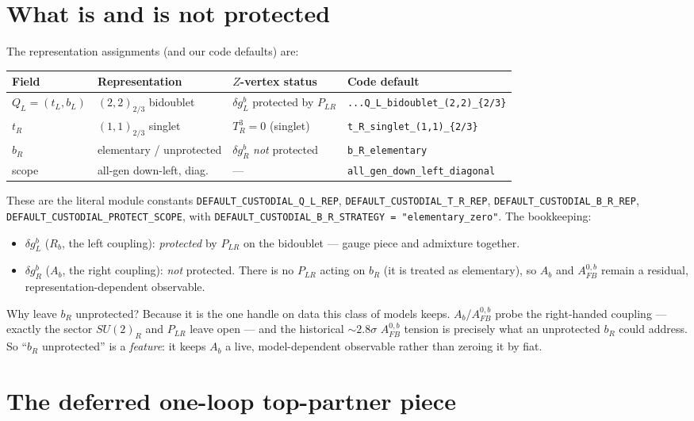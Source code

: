 \documentclass[11pt]{article}
\newcommand{\SUR}{SU(2)_R}
\newcommand{\PLR}{P_{LR}}
\newcommand{\code}[1]{\texttt{#1}}
\newcommand{\dgL}{\delta g_L^b}
\newcommand{\dgR}{\delta g_R^b}
\newcommand{\Afb}{A_{FB}^{0,b}}
\theoremstyle{definition}
\begin{document}
\section{What is and is not protected}
\label{sec:protect}

The representation assignments (and our code defaults) are:
\begin{center}
\begin{tabular}{llll}
\toprule
Field & Representation & $Z$-vertex status & Code default \\
\midrule
$Q_L=(t_L,b_L)$ & $(2,2)_{2/3}$ bidoublet & $\dgL$ protected by $\PLR$ & \code{...Q\_L\_bidoublet\_(2,2)\_\{2/3\}} \\
$t_R$ & $(1,1)_{2/3}$ singlet & $T^3_R=0$ (singlet) & \code{t\_R\_singlet\_(1,1)\_\{2/3\}} \\
$b_R$ & elementary / unprotected & $\dgR$ \emph{not} protected & \code{b\_R\_elementary} \\
scope & all-gen down-left, diag.\ & --- & \code{all\_gen\_down\_left\_diagonal} \\
\bottomrule
\end{tabular}
\end{center}
These are the literal module constants \code{DEFAULT\_CUSTODIAL\_Q\_L\_REP},
\code{DEFAULT\_CUSTODIAL\_T\_R\_REP}, \code{DEFAULT\_CUSTODIAL\_B\_R\_REP},
\code{DEFAULT\_CUSTODIAL\_PROTECT\_SCOPE}, with
\code{DEFAULT\_CUSTODIAL\_B\_R\_STRATEGY = "elementary\_zero"}. The bookkeeping:
\begin{itemize}[leftmargin=1.4em]
\item $\dgL$ ($R_b$, the left coupling): \emph{protected} by $\PLR$ on the
bidoublet --- gauge piece and admixture together.
\item $\dgR$ ($A_b$, the right coupling): \emph{not} protected. There is no
$\PLR$ acting on $b_R$ (it is treated as elementary), so $A_b$ and $\Afb$ remain
a residual, representation-dependent observable.
\end{itemize}
Why leave $b_R$ unprotected? Because it is the one handle on data this class of
models keeps. $A_b$/$\Afb$ probe the right-handed coupling --- exactly the sector
$\SUR$ and $\PLR$ leave open --- and the historical $\sim 2.8\sigma$ $\Afb$
tension is precisely what an unprotected $b_R$ could address. So
``$b_R$ unprotected'' is a \emph{feature}: it keeps $A_b$ a live,
model-dependent observable rather than zeroing it by fiat.

\section{The deferred one-loop top-partner piece}
\label{sec:loop}
\end{document}
